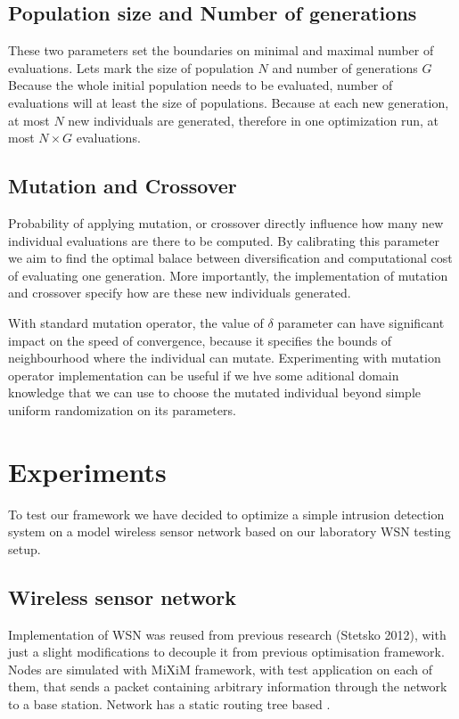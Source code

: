 \documentclass[12pt,oneside]{fithesis2}
\begin{document}
\section{Population size and Number of generations}
These two parameters set the boundaries on minimal and maximal number of evaluations. Lets mark the size of population $N$ and number of generations $G$ Because the whole initial population needs to be evaluated, number of evaluations will at least the size of populations.
Because at each new generation, at most $N$ new individuals are generated, therefore in one optimization run, at most $N \times G$ evaluations.

\section{Mutation and Crossover}
Probability of applying mutation, or crossover directly influence how many new individual evaluations are there to be computed. By calibrating this parameter we aim to find the optimal balace between diversification and computational cost of evaluating one generation. More importantly, the implementation of mutation and crossover specify how are these new individuals generated. 

With standard mutation operator, the value of $\delta$ parameter can have significant impact on the speed of convergence, because it specifies the bounds of neighbourhood where the individual can mutate. Experimenting with mutation operator implementation can be useful if we hve some aditional domain knowledge that we can use to choose the mutated individual beyond simple uniform randomization on its parameters.

\chapter{Experiments}
To test our framework we have decided to optimize a simple intrusion detection system on a model wireless sensor network based on our laboratory WSN testing setup.

\section{Wireless sensor network}
Implementation of WSN was reused from previous research (Stetsko 2012), with just a slight modifications to decouple it from previous optimisation framework. Nodes are simulated with MiXiM framework, with test application on each of them, that sends a packet containing arbitrary information through the network to a base station. Network has a static routing tree based . 
\end{document}
